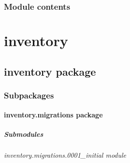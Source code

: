 \documentclass[a4paper,11pt,spanish]{sphinxmanual}
\begin{document}
\subsection{Module contents}
\label{\detokenize{api/dashboard/dashboard:module-dashboard}}\label{\detokenize{api/dashboard/dashboard:module-contents}}
\sphinxstepscope


\chapter{inventory}
\label{\detokenize{api/inventory/modules:inventory}}\label{\detokenize{api/inventory/modules::doc}}
\sphinxstepscope


\section{inventory package}
\label{\detokenize{api/inventory/inventory:inventory-package}}\label{\detokenize{api/inventory/inventory::doc}}

\subsection{Subpackages}
\label{\detokenize{api/inventory/inventory:subpackages}}
\sphinxstepscope


\subsubsection{inventory.migrations package}
\label{\detokenize{api/inventory/inventory.migrations:inventory-migrations-package}}\label{\detokenize{api/inventory/inventory.migrations::doc}}

\paragraph{Submodules}
\label{\detokenize{api/inventory/inventory.migrations:submodules}}
\sphinxstepscope


\subparagraph{inventory.migrations.0001\_initial module}
\label{\detokenize{api/inventory/inventory.migrations.0001_initial:module-inventory.migrations.0001_initial}}\label{\detokenize{api/inventory/inventory.migrations.0001_initial:inventory-migrations-0001-initial-module}}\label{\detokenize{api/inventory/inventory.migrations.0001_initial::doc}}
\end{document}
